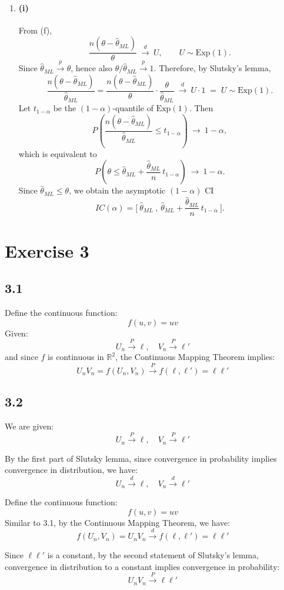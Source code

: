 \documentclass[12pt]{article}
\begin{document}
\begin{flushleft}
\begin{enumerate}[label=(\alph*)]
\item
\paragraph{(i)}
From (f),
\[
\frac{n(\theta-\hat\theta_{ML})}{\theta}\ \xrightarrow{d}\ U,\qquad U\sim\mathrm{Exp}(1).
\]
Since $\hat\theta_{ML} \xrightarrow{p} \theta$, hence also $\theta/\hat\theta_{ML}\xrightarrow{p}1$.
Therefore, by Slutsky’s lemma,
\[
\frac{n(\theta-\hat\theta_{ML})}{\hat\theta_{ML}}
=\frac{n(\theta-\hat\theta_{ML})}{\theta}\cdot\frac{\theta}{\hat\theta_{ML}}
\ \xrightarrow{d}\ U\cdot 1 \;=\; U\sim\mathrm{Exp}(1).
\]
Let $t_{1-\alpha}$ be the $(1-\alpha)$-quantile of $\mathrm{Exp}(1)$. Then
\[
P\!\left(\frac{n(\theta-\hat\theta_{ML})}{\hat\theta_{ML}}\le t_{1-\alpha}\right)\ \to\ 1-\alpha,
\]
which is equivalent to
\[
P\!\left(\theta \le \hat\theta_{ML}+\frac{\hat\theta_{ML}}{n}\,t_{1-\alpha}\right)\ \to\ 1-\alpha.
\]
Since $\hat\theta_{ML}\le \theta$, we obtain the asymptotic $(1-\alpha)$ CI
\[
IC(\alpha)=\bigg[\ \hat\theta_{ML}\ ,\ \hat\theta_{ML}+\frac{\hat\theta_{ML}}{n}\,t_{1-\alpha}\ \bigg].
\]

\end{enumerate}

\section*{Exercise 3}

\subsection*{3.1}
Define the continuous function:
\[
f(u,v) = uv
\]
Given:
\[
U_n \xrightarrow{P} \ell, \quad V_n \xrightarrow{P} \ell'
\]
and since \(f\) is continuous in \(\mathbb{R}^2\), the Continuous Mapping Theorem implies:
\[
U_n V_n = f(U_n, V_n) \xrightarrow{P} f(\ell, \ell') = \ell \ell'
\]

\subsection*{3.2}
We are given:
\[
U_n \xrightarrow{P} \ell, \quad V_n \xrightarrow{P} \ell'
\]

By the first part of Slutsky lemma, since convergence in probability implies convergence in distribution, we have:
\[
U_n \xrightarrow{d} \ell, \quad V_n \xrightarrow{d} \ell'
\]



Define the continuous function:
\[
f(u, v) = uv
\]
Similar to 3.1, by the Continuous Mapping Theorem, we have:
\[
f(U_n, V_n) = U_n V_n \xrightarrow{d} f(\ell, \ell') = \ell \ell'
\]


Since \(\ell \ell'\) is a constant, by the second statement of Slutsky's lemma, convergence in distribution to a constant implies convergence in probability:
\[
U_n V_n \xrightarrow{P} \ell \ell'
\]




\end{flushleft}
\end{document}
